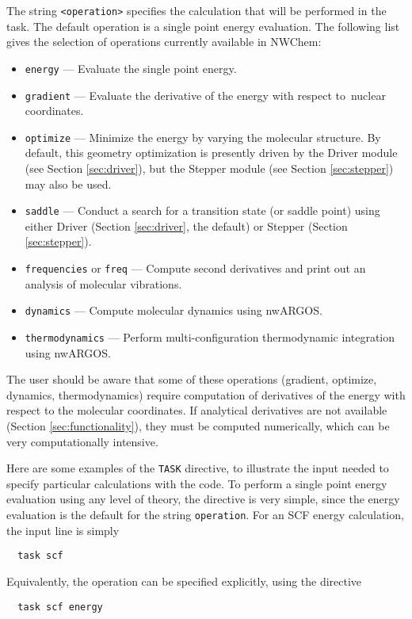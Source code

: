 The string \verb+<operation>+ specifies the calculation that will
be performed in the task.  The default operation is a single point energy
evaluation.  The following list gives the selection of operations currently
available in NWChem:
\begin{itemize}
\item \verb+energy+ --- Evaluate the single point energy.
\item \verb+gradient+ --- Evaluate the derivative of the energy with respect to\
   nuclear coordinates.
\item \verb+optimize+ --- Minimize the energy by varying the molecular
   structure.  By default, this geometry optimization is presently driven by the Driver
   module (see Section \ref{sec:driver}), but the Stepper module
   (see Section \ref{sec:stepper}) may also be used.
\item \verb+saddle+ --- Conduct a search for a transition state (or saddle point) 
  using either Driver (Section \ref{sec:driver}, the default) or
  Stepper (Section \ref{sec:stepper}).
\item \verb+frequencies+ or \verb+freq+ --- Compute second derivatives 
and print out an analysis of molecular vibrations.
\item \verb+dynamics+ --- Compute molecular dynamics using nwARGOS.
\item \verb+thermodynamics+ --- Perform multi-con\-fig\-ura\-tion
  thermo\-dynamic integ\-ration using nwARGOS.
\end{itemize}


The user should be aware that some of these operations (gradient,
optimize, dynamics, thermodynamics) require computation of
derivatives of the energy with respect to the molecular coordinates.
If analytical derivatives are not available (Section
\ref{sec:functionality}), they must be computed numerically, which can
be very computationally intensive.

Here are some examples of the \verb+TASK+ directive, to illustrate the
input needed to specify particular calculations with the code.  To
perform a single point energy evaluation using any level of theory, the
directive is very simple, since the energy evaluation is the default
for the string \verb+operation+.  For an SCF energy calculation, the
input line is simply
\begin{verbatim}
  task scf
\end{verbatim}
Equivalently, the operation can be specified explicitly, using the
directive
\begin{verbatim}
  task scf energy
\end{verbatim}

